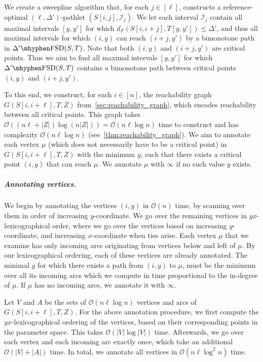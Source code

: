 \documentclass[a4paper,UKenglish,cleveref,thm-restate,notab]{lipics-v2021}
\newcommand{\dF}{\ensuremath{d_F}}
\newcommand{\FSD}[1][\Delta'] {\ensuremath{#1}\mhyphen\mathrm{FSD}}
\newcommand{\bigO}{\mathcal{O}}
\newcommand{\I}{\mathcal{I}}
\begin{document}
    We create a sweepline algorithm that, for each $j \in [\ell]$, constructs a reference-optimal $(\ell, \Delta')$-pathlet $(S[i, j], \I_j)$. 
    We let each interval $\I_j$ contain all maximal intervals $[y, y']$ for which $\dF(S[i, i+j], T[y, y']) \leq \Delta'$, and thus all maximal intervals for which $(i, y)$ can reach $(i+j, y')$ by a bimonotone path in $\FSD(S, T)$.
    Note that both $(i, y)$ and $(i+j, y')$ are critical points.
    Thus we aim to find all maximal intervals $[y, y']$ for which $\FSD(S, T)$ contains a bimonotone path between critical points $(i, y)$ and $(i+j, y')$.
    
    To this end, we construct, for each $i \in [n]$, the reachability graph $G(S[i, i+\ell], T, Z)$ from~\cref{sec:reachability_graph}, which encodes reachability between all critical points.
    This graph takes $\bigO((n \ell + |Z|) \log (n|Z|)) = \bigO(n \ell \log n)$ time to construct and has complexity $\bigO(n \ell \log n)$ (see~\cref{thm:reachability_graph}).
    We aim to annotate each vertex $\mu$ (which does not necessarily have to be a critical point) in $G(S[i, i+\ell], T, Z)$ with the minimum $y$, such that there exists a critical point $(i, y)$ that can reach $\mu$.
    We annotate $\mu$ with $\infty$ if no such value $y$ exists.
    
\subparagraph*{Annotating vertices.}
    We begin by annotating the vertices $(i, y)$ in $\bigO(n)$ time, by scanning over them in order of increasing $y$-coordinate.
    We go over the remaining vertices in $yx$-lexicographical order, where we go over the vertices based on increasing $y$-coordinate, and increasing $x$-coordinate when ties arise.
    Each vertex $\mu$ that we examine has only incoming arcs originating from vertices below and left of $\mu$.
    By our lexicographical ordering, each of these vertices are already annotated. 
    The minimal $y$ for which there exists a path from $(i, y)$ to $\mu$, must be the minimum over all its incoming arcs which we compute in time proportional to the in-degree of $\mu$. 
    If $\mu$ has no incoming arcs, we annotate it with $\infty$. 
    
    Let $V$ and $A$ be the sets of $\bigO(n \ell \log n)$ vertices and arcs of $G(S[i, i+\ell], T, Z)$.
    For the above annotation procedure, we first compute the $yx$-lexicographical ordering of the vertices, based on their corresponding points in the parameter space.
    This takes $\bigO(|V| \log |V|)$ time.
    Afterwards, we go over each vertex and each incoming arc exactly once, which take an additional $\bigO(|V| + |A|)$ time.
    In total, we annotate all vertices in $\bigO(n \ell \log^2 n)$ time.
\end{document}
